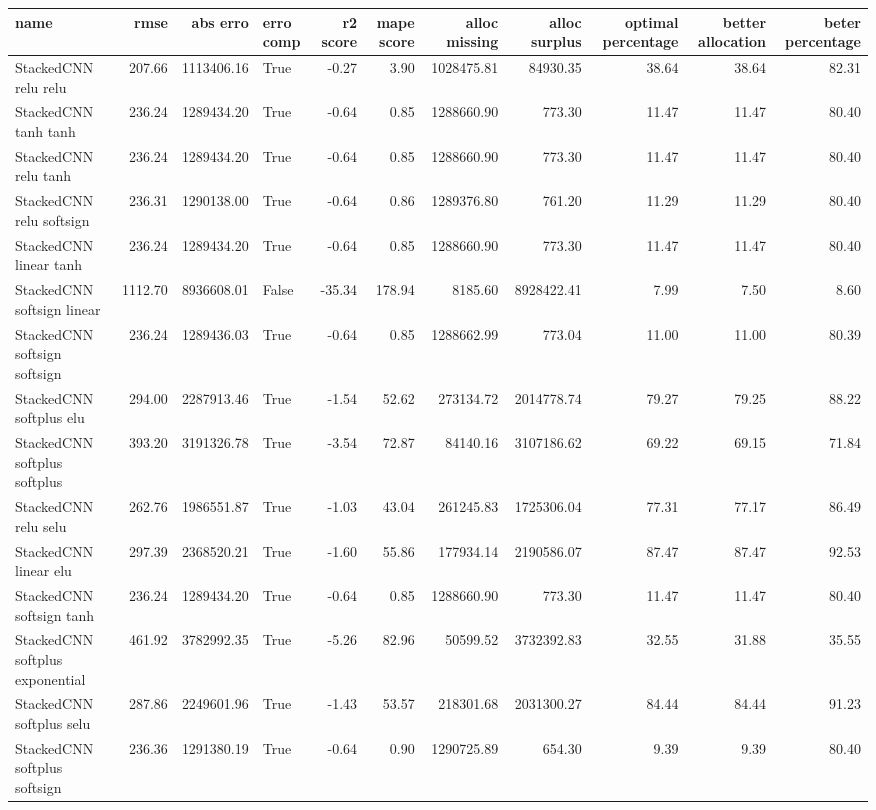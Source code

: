 \begin{tabular}{lrrlrrrrrrr}
\toprule
name & rmse & abs erro & erro comp & r2 score & mape score & alloc missing & alloc surplus & optimal percentage & better allocation & beter percentage \\
\midrule
StackedCNN relu relu & 207.66 & 1113406.16 & True & -0.27 & 3.90 & 1028475.81 & 84930.35 & 38.64 & 38.64 & 82.31 \\
StackedCNN tanh tanh & 236.24 & 1289434.20 & True & -0.64 & 0.85 & 1288660.90 & 773.30 & 11.47 & 11.47 & 80.40 \\
StackedCNN relu tanh & 236.24 & 1289434.20 & True & -0.64 & 0.85 & 1288660.90 & 773.30 & 11.47 & 11.47 & 80.40 \\
StackedCNN relu softsign & 236.31 & 1290138.00 & True & -0.64 & 0.86 & 1289376.80 & 761.20 & 11.29 & 11.29 & 80.40 \\
StackedCNN linear tanh & 236.24 & 1289434.20 & True & -0.64 & 0.85 & 1288660.90 & 773.30 & 11.47 & 11.47 & 80.40 \\
StackedCNN softsign linear & 1112.70 & 8936608.01 & False & -35.34 & 178.94 & 8185.60 & 8928422.41 & 7.99 & 7.50 & 8.60 \\
StackedCNN softsign softsign & 236.24 & 1289436.03 & True & -0.64 & 0.85 & 1288662.99 & 773.04 & 11.00 & 11.00 & 80.39 \\
StackedCNN softplus elu & 294.00 & 2287913.46 & True & -1.54 & 52.62 & 273134.72 & 2014778.74 & 79.27 & 79.25 & 88.22 \\
StackedCNN softplus softplus & 393.20 & 3191326.78 & True & -3.54 & 72.87 & 84140.16 & 3107186.62 & 69.22 & 69.15 & 71.84 \\
StackedCNN relu selu & 262.76 & 1986551.87 & True & -1.03 & 43.04 & 261245.83 & 1725306.04 & 77.31 & 77.17 & 86.49 \\
StackedCNN linear elu & 297.39 & 2368520.21 & True & -1.60 & 55.86 & 177934.14 & 2190586.07 & 87.47 & 87.47 & 92.53 \\
StackedCNN softsign tanh & 236.24 & 1289434.20 & True & -0.64 & 0.85 & 1288660.90 & 773.30 & 11.47 & 11.47 & 80.40 \\
StackedCNN softplus exponential & 461.92 & 3782992.35 & True & -5.26 & 82.96 & 50599.52 & 3732392.83 & 32.55 & 31.88 & 35.55 \\
StackedCNN softplus selu & 287.86 & 2249601.96 & True & -1.43 & 53.57 & 218301.68 & 2031300.27 & 84.44 & 84.44 & 91.23 \\
StackedCNN softplus softsign & 236.36 & 1291380.19 & True & -0.64 & 0.90 & 1290725.89 & 654.30 & 9.39 & 9.39 & 80.40 \\

\end{tabular}
